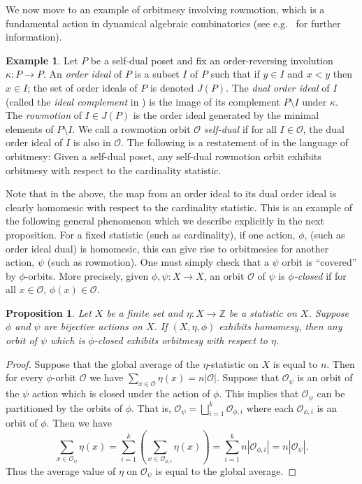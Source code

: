 \documentclass[11pt]{amsart}
\newtheorem{proposition}[theorem]{Proposition}
\theoremstyle{definition}
\newtheorem{example}[theorem]{Example}
\begin{document}
We now move to an example of orbitmesy involving rowmotion, which is a fundamental action in dynamical algebraic combinatorics (see e.g.~\cite{SW2012,Striker2017} for further information). 
\begin{example}
Let $P$ be a self-dual poset and fix an order-reversing involution $\kappa:P\rightarrow P$. An \emph{order ideal} of $P$ is a subset $I$ of $P$ such that if $y\in I$ and $x<y$ then $x\in I$; the set of order ideals of $P$ is denoted $J(P)$. The \emph{dual order ideal} of $I$ (called the \emph{ideal complement} in \cite[p.4]{elizalde2021rowmotion}) is the image of its complement $P\setminus I$ under $\kappa$. 
The \emph{rowmotion} of $I\in J(P)$ is the order ideal generated by the minimal elements of $P\setminus I$.  We call a rowmotion orbit $\mathcal{O}$  \emph{self-dual} if for all $I\in \mathcal{O}$, the dual order ideal of $I$ is also in $\mathcal{O}$. The following is a restatement of \cite[Corollary 3.3(a)]{elizalde2021rowmotion} in the language of orbitmesy:
    Given a self-dual poset, 
    any self-dual  rowmotion orbit exhibits orbitmesy  with respect to the cardinality statistic. 
\end{example}

Note that in the above, the map from an order ideal to its dual order ideal is clearly homomesic with respect to the cardinality statistic.
This is an example of the following general phenomenon which we describe explicitly in the next proposition. For a fixed statistic (such as cardinality), if one action, $\phi$, (such as order ideal dual) is homomesic, this can give rise to orbitmesies for another action, $\psi$ (such as rowmotion).
One must simply check that a $\psi$ orbit is ``covered'' by $\phi$-orbits.  More precisely, given $\phi,\psi:X\rightarrow X$, an orbit $\mathcal{O}$ of $\psi$ is \emph{$\phi$-closed} if for all $x\in \mathcal{O}$, $\phi(x)\in\mathcal{O}$.

\begin{proposition}\label{prop:homomesy-to-orbitmesy}
Let $X$ be a finite set and $\eta:X\to \mathbb{Z}$ be a statistic on $X$.
Suppose $\phi$ and $\psi$ are bijective actions on $X$.  If $(X,\eta, \phi)$ exhibits homomesy, then any orbit of $\psi$ which is $\phi$-closed exhibits orbitmesy with respect to $\eta$.
\end{proposition}
\begin{proof}
Suppose that the global average of the $\eta$-statistic on $X$ is equal to $n$.
Then for every $\phi$-orbit $\mathcal{O}$ we have $\sum_{x\in\mathcal{O}} \eta(x) = n |\mathcal{O}|$.
Suppose that $\mathcal{O}_{\psi}$ is an orbit of the $\psi$ action which is closed under the action of $\phi.$
This implies that $\mathcal{O}_{\psi}$ can be partitioned by the orbits of $\phi$.
That is, $\mathcal{O}_{\psi}=\bigsqcup_{i=1}^k\mathcal{O}_{\phi, i}$ where each $\mathcal{O}_{\phi, i}$ is an orbit of $\phi$.  Then we have 
\[\sum_{x\in \mathcal{O}_{\psi}} \eta(x) = \sum_{i=1}^k \left(\sum_{x\in \mathcal{O}_{\phi,i}} \eta(x)\right) = \sum_{i=1}^k n |\mathcal{O}_{\phi,i}| = n |\mathcal{O}_{\psi}|.\]
Thus the average value of $\eta$ on $\mathcal{O}_{\psi}$ is equal to the global average.
\end{proof}
\end{document}
